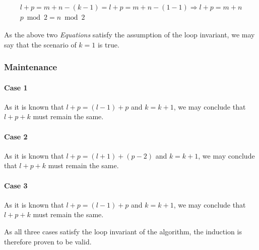 \documentclass[12pt]{article}
\begin{document}
\begin{gather}
    l + p = m + n - (k - 1) = l + p = m + n - (1 - 1) \Rightarrow l + p = m + n \\
    p\bmod 2 = n \bmod 2
\end{gather}

As the above two \textit{Equations} satisfy the assumption of the loop invariant, we may say that the scenario of $k = 1$ is true.

\subsubsection{Maintenance}

\paragraph{Case 1} As it is known that $l + p = (l - 1) + p$ and $k = k + 1$, we may conclude that $l + p + k$ must remain the same.

\paragraph{Case 2} As it is known that $l + p = (l + 1) + (p - 2)$ and $k = k + 1$, we may conclude that $l + p + k$ must remain the same.

\paragraph{Case 3} As it is known that $l + p = (l - 1) + p$ and $k = k + 1$, we may conclude that $l + p + k$ must remain the same.

As all three cases satisfy the loop invariant of the algorithm, the induction is therefore proven to be valid.





%
% 
% 
\end{document}
